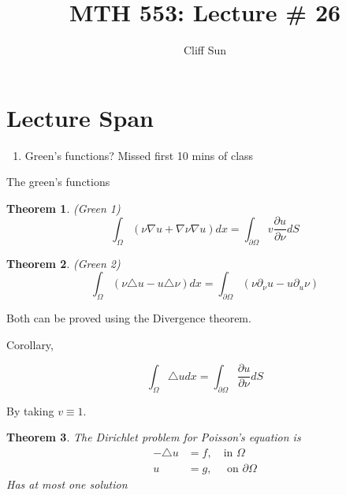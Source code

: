 \documentclass{article}
\title{MTH 553: Lecture \# 26}
\author{Cliff Sun}
\newtheorem{theorem}{Theorem}[section]
\newtheorem{one minute paper}[theorem]{One Minute Paper}
\begin{document}
\maketitle

\section*{Lecture Span}
\begin{enumerate}
    \item Green's functions? Missed first 10 mins of class
\end{enumerate}

The green's functions

\begin{theorem}
    (Green 1) 
    \begin{equation}
        \int_{\Omega}(\nu \nabla u + \nabla \nu \nabla u) dx = \int_{\partial\Omega}v \frac{\partial u}{\partial \nu}dS
    \end{equation}
\end{theorem}

\begin{theorem}
    (Green 2)
    \begin{equation}
        \int_{\Omega}(\nu \triangle u - u \triangle \nu) dx = \int_{\partial \Omega}\left(\nu \partial_{\nu}u - u \partial_{u}\nu \right)
    \end{equation}
\end{theorem}

Both can be proved using the Divergence theorem.

Corollary, 

\begin{equation}
    \int_{\Omega}\triangle u dx = \int_{\partial\Omega}\frac{\partial u}{\partial \nu}dS
\end{equation}

By taking $v \equiv 1$. 

\begin{theorem}
    The Dirichlet problem for Poisson's equation is 
    \begin{align}
        -\triangle u &= f, \quad \text{in $\Omega$} \\
        u &= g, \quad \text{ on $\partial \Omega$}
    \end{align}
    Has at most one solution
\end{theorem}
\end{document}
